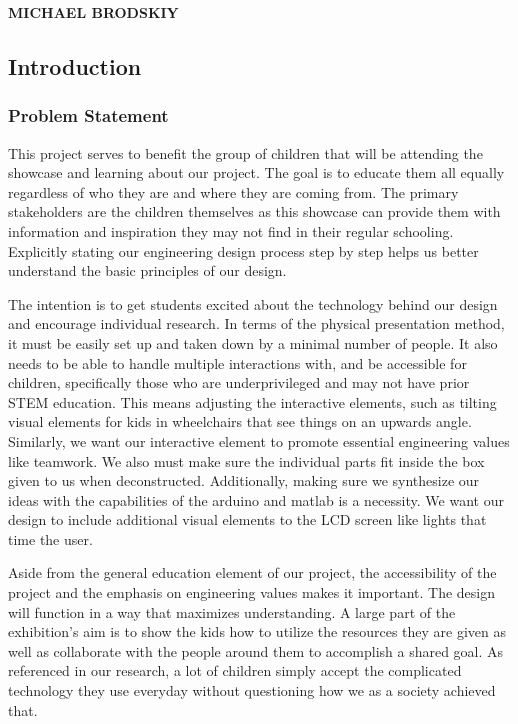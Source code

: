 \documentclass[conference]{IEEEtran}
\begin{document}
\newpage


\vspace{10pt} \LARGE \textbf{MICHAEL BRODSKIY} \normalsize

\subsection{Introduction}

\subsubsection{Problem Statement} \label{ps}

\par This project serves to benefit the group of children that will be attending the showcase and learning about our project. The goal is to educate them all equally regardless of who they are and where they are coming from. The primary stakeholders are the children themselves as this showcase can provide them with information and inspiration they may not find in their regular schooling. Explicitly stating our engineering design process step by step helps us better understand the basic principles of our design.
\par The intention is to get students excited about the technology behind our design and encourage individual research. In terms of the physical presentation method, it must be easily set up and taken down by a minimal number of people. It also needs to be able to handle multiple interactions with, and be accessible for children, specifically those who are underprivileged and may not have prior STEM education. This means adjusting the interactive elements, such as tilting visual elements for kids in wheelchairs that see things on an upwards angle. Similarly, we want our interactive element to promote essential engineering values like teamwork. We also must make sure the individual parts fit inside the box given to us when deconstructed. Additionally, making sure we synthesize our ideas with the capabilities of the arduino and matlab is a necessity. We want  our design to include additional visual elements to the LCD screen like lights that time the user. 
\par Aside from the general education element of our project, the accessibility of the project and the emphasis on engineering values makes it important. The design will function in a way that maximizes understanding. A large part of the exhibition's aim is to show the kids how to utilize the resources they are given as well as collaborate with the people around them to accomplish a shared goal. As referenced in our research, a lot of children simply accept the complicated technology they use everyday without questioning how we as a society achieved that.
\end{document}
